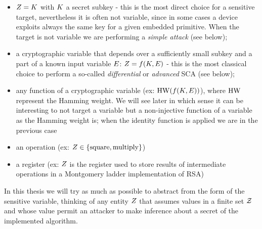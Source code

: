 \begin{itemize}
\item $Z = K$ with $K$ a secret subkey - this is the most direct choice for a sensitive target, nevertheless it is often not variable, since in some cases a device exploits always the same key for a given embedded primitive. When the target is not variable we are performing a \emph{simple attack} (see below);
\item a cryptographic variable that depends over a sufficiently small subkey and a part of a known input variable $E$: $Z = f(K,E)$ - this is the most classical choice to perform a so-called \emph{differential} or \emph{advanced} SCA (see below);
\item any function of a cryptographic variable (ex: $\mathrm{HW}(f(K,E))$), where $\mathrm{HW}$ represent the Hamming weight. We will see later in which sense it can be interesting to not target a variable but a non-injective function of a variable as the Hamming weight is; when the identity function is applied we are in the previous case
\item an operation (ex: $Z \in \{\mathrm{square}, \mathrm{multiply}\}$)
\item a register (ex: $Z$ is the register used to store results of intermediate operations in a Montgomery ladder implementation of RSA)
\end{itemize}
In this thesis we will try as much as possible to abstract from the form of the sensitive variable, thinking of any entity $Z$ that assumes values in a finite set $\mathcal{Z}$ and whose value permit an attacker to make inference about a secret of the implemented algorithm.

